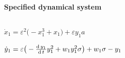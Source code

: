 
\begin{math}
\end{math}
\paragraph{Specified dynamical system}
\begin{math}
\end{math}\par

\begin{math}
\dot x_{1}=\varepsilon ^{2} \big(-x_{1}^{3}+x_{1}\big)+\varepsilon  y_{1
} a
\end{math}\par

\begin{math}
\dot y_{1}=\varepsilon  \big(-\frac{{\rm d}\,y_{1}}{{\rm d}\,t} y_{1}^{2
}+w_{1} y_{1}^{2} \sigma \big)+w_{1} \sigma -y_{1}
\end{math}\par
